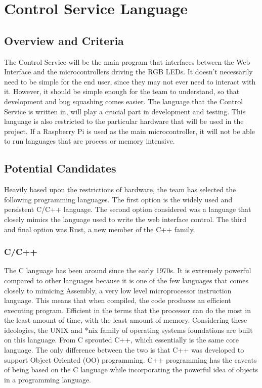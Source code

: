 \documentclass[onecolumn, draftclsnofoot,10pt, compsoc]{IEEEtran}
\begin{document}
		\newpage %

		\section{Control Service Language}

			\subsection{Overview and Criteria}
			The Control Service will be the main program that interfaces between the Web Interface and the microcontrollers driving the RGB LEDs.  It doesn't necessarily need to be simple
			for the end user, since they may not ever need to interact with it.  However, it should be simple enough for the team to understand, so that development and bug squashing comes
			easier.  The language that the Control Service is written in, will play a crucial part in development and testing.  This language is also restricted to the particular hardware
			that will be used in the project.  If a Raspberry Pi is used as the main microcontroller, it will not be able to run languages that are process or memory intensive.

			\subsection{Potential Candidates}
			Heavily based upon the restrictions of hardware, the team has selected the following programming languages.  The first option is the widely used and persistent C/C++ language.
			The second option considered was a language that closely mimics the language used to write the web interface control.  The third and final option was Rust, a new member of the
			C++ family.

			\subsubsection{C/C++}
			The C language has been around since the early 1970s. \cite{LANG1}  It is extremely powerful compared to other languages because it is one of the few languages that comes closely
			to mimicing Assembly, a very low level microprocessor instruction language.  This means that when compiled, the code produces an efficient executing program.  Efficient in the terms
			that the processor can do the most in the least amount of time, with the least amount of memory. Considering these ideologies, the UNIX and *nix family of operating systems
			foundations are built on this language.  From C sprouted C++, which essentially is the same core language.  The only difference between the two is that C++ was developed to support Object Oriented (OO) programming.  C++ programming has the caveats of
			being based on the C language while incorporating the powerful idea of objects in a programming language.
\end{document}
